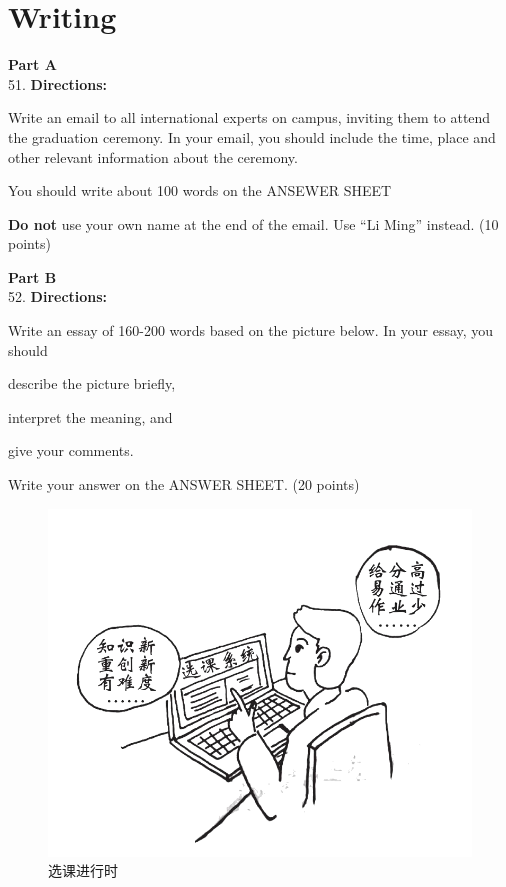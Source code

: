\newpage
\section{Writing}


\noindent
\textbf{Part A}\\
51. \textbf{Directions:}

Write an email to all international experts on campus, inviting them to
attend the graduation ceremony. In your email, you should include the
time, place and other relevant information about the ceremony.

You should write about 100 words on the ANSEWER SHEET

\textbf{Do not} use your own name at the end of the email. Use ``Li
Ming'' instead. (10 points)

\vspace{2em}

\noindent
\textbf{Part B}\\
52. \textbf{Directions:}

Write an essay of 160-200 words based on the picture below. In your
essay, you should
\begin{listwrite}
	\item
describe the picture briefly,

\item 
 interpret the meaning, and

\item 
 give your comments.
\end{listwrite}


Write your answer on the ANSWER SHEET. (20 points)


\begin{figure}[h!]
	\centering
	\includegraphics[width=0.53\linewidth]{picture/2018.png}
	\caption*{选课进行时}
\end{figure}



